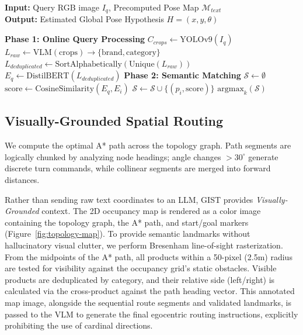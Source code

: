 \documentclass[sigconf,anonymous,review]{acmart}
\begin{document}
\begin{algorithm}[h!]
\caption{One-Shot Text-Based Semantic Localization}
\label{alg:semantic_loc}
\small
\textbf{Input:} Query RGB image $I_q$, Precomputed Pose Map $\mathcal{M}_{text}$ \\
\textbf{Output:} Estimated Global Pose Hypothesis $H = (x, y, \theta)$
\begin{algorithmic}[1]
\State \textbf{Phase 1: Online Query Processing}
\State $C_{crops} \gets \text{YOLOv9}(I_q)$ 
\State $L_{raw} \gets \text{VLM}(\text{crops}) \to \{\text{brand}, \text{category}\}$
\State $L_{deduplicated} \gets \text{SortAlphabetically}(\text{Unique}(L_{raw}))$
\State $E_q \gets \text{DistilBERT}(L_{deduplicated})$ 
\State \textbf{Phase 2: Semantic Matching}
\State $\mathcal{S} \gets \emptyset$
    \State $\text{score} \gets \text{CosineSimilarity}(E_q, E_i)$
    \State $\mathcal{S} \gets \mathcal{S} \cup \{(p_i, \text{score})\}$
\EndFor
\State \Return $\text{argmax}_{k}(\mathcal{S})$ 
\end{algorithmic}
\end{algorithm}

\subsection{Visually-Grounded Spatial Routing}
We compute the optimal A* path across the topology graph. Path segments are logically chunked by analyzing node headings; angle changes $>30^\circ$ generate discrete turn commands, while collinear segments are merged into forward distances. 

Rather than sending raw text coordinates to an LLM, GIST provides \emph{Visually-Grounded} context. The 2D occupancy map is rendered as a color image containing the topology graph, the A* path, and start/goal markers (Figure~\ref{fig:topology-map}). To provide semantic landmarks without hallucinatory visual clutter, we perform Bresenham line-of-sight rasterization. From the midpoints of the A* path, all products within a 50-pixel (2.5m) radius are tested for visibility against the occupancy grid's static obstacles. Visible products are deduplicated by category, and their relative side (left/right) is calculated via the cross-product against the path heading vector. This annotated map image, alongside the sequential route segments and validated landmarks, is passed to the VLM to generate the final egocentric routing instructions, explicitly prohibiting the use of cardinal directions.
\end{document}
